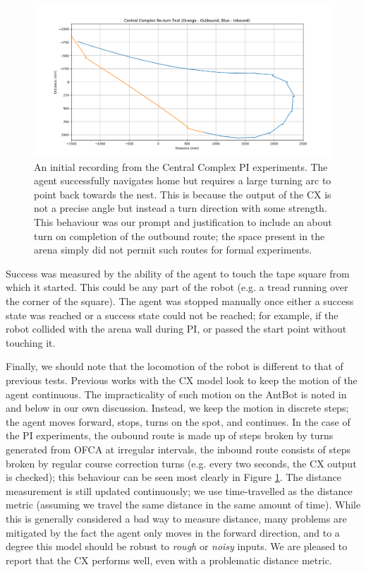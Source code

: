 \documentclass[a4paper,11pt,twoside,openright]{article}
\begin{document}
\begin{figure}[h!]
  \centering
  \includegraphics[width=\textwidth]{CXNT}
  \caption{\label{fig:cxnt} An initial recording from the Central Complex
    PI experiments. The agent successfully navigates home but requires a large
    turning arc to point back towards the nest. This is because the output of the
    CX is not a precise angle but instead a turn direction with some strength.
    This behaviour was our prompt and justification to include an about turn on
    completion of the outbound route; the space present in the arena simply did
    not permit such routes for formal experiments.
  }
\end{figure}

Success was measured by the ability of the agent to touch the tape
square from which it started. This could be any part of the robot
(e.g. a tread running over the corner of the square). The agent was
stopped manually once either a success state was reached or a success
state could not be reached; for example, if the robot collided with
the arena wall during PI, or passed the start point without touching it.
\newline\par

Finally,  we should note that the locomotion of the robot is different to that of
previous tests. Previous works with the CX model look to keep the motion of the
agent continuous. The impracticality of such motion on the AntBot is noted in
\cite{Mitchell2018} and below in our own discussion. Instead, we keep the motion
in discrete steps; the agent moves forward, stops, turns on the spot, and
continues. In the case of the PI experiments, the oubound route is made up of
steps broken by turns generated from OFCA at irregular intervals, the inbound
route consists of steps broken by regular course correction turns (e.g. every two
seconds, the CX output is checked); this behaviour can be seen most
clearly in Figure \ref{fig:cxnt}. The distance measurement is still updated
continuously; we use time-travelled as the distance metric (assuming we
travel the same distance in the same amount of time). While this is generally
considered a bad way to measure distance, many problems are mitigated by the
fact the agent only moves in the forward direction, and to a degree this model
should be robust to \textit{rough} or \textit{noisy} inputs. We are pleased to
report that the CX performs well, even with a problematic distance metric.
\end{document}
